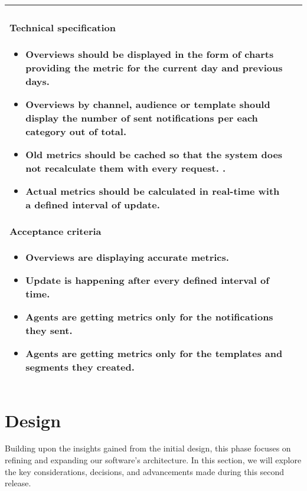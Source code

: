 \begin{longtable}{ | m{} | m{} | }
    \paragraph*{Technical specification} \mbox{} \newline
    \begin{itemize}
        \item Overviews should be displayed in the form of charts providing the metric for the current day and previous days.
        \item Overviews by channel, audience or template should display the number of sent notifications per each category
              out of total.
        \item Old metrics should be cached so that the system does not recalculate them with every request.        .
        \item Actual metrics should be calculated in real-time with a defined interval of update.
    \end{itemize}
    \paragraph*{Acceptance criteria} \mbox{} \newline
    \begin{itemize}
        \item Overviews are displaying accurate metrics.
        \item Update is happening after every defined interval of time.
        \item Agents are getting metrics only for the notifications they sent.
        \item Agents are getting metrics only for the templates and segments they created.
    \end{itemize}                                                                                                                                                            \\
    \hline
\end{longtable}

\section{Design}
Building upon the insights gained from the initial design, this phase focuses on refining and expanding our
software's architecture. In this section, we will explore the key considerations, decisions, and advancements
made during this second release.

